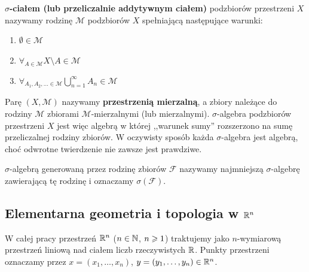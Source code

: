 \begin{defi}
    \textbf{$\sigma$-ciałem (lub przeliczalnie addytywnym ciałem)} podzbiorów przestrzeni $X$ nazywamy rodzinę $\mathcal{M}$ podzbiorów $X$ spełniającą następujące warunki:
    \begin{enumerate}
        \item $\emptyset \in \mathcal{M}$
        \item $\forall_{A \in \mathcal{M}} X \setminus A \in \mathcal{M}$
        \item $\forall_{A_1, A_2, \ldots \in \mathcal{M}} \bigcup_{n = 1}^\infty A_n \in \mathcal{M}$
    \end{enumerate}
    Parę $(X, \mathcal{M})$ nazywamy \textbf{przestrzenią mierzalną}, a zbiory należące do rodziny $\mathcal{M}$ zbiorami $\mathcal{M}$-mierzalnymi (lub mierzalnymi).
    $\sigma$-algebra podzbiorów przestrzeni $X$ jest więc algebrą w której ,,warunek sumy'' rozszerzono na sumę przeliczalnej rodziny zbiorów. W oczywisty sposób każda $\sigma$-algebra jest algebrą, choć odwrotne twierdzenie nie zawsze jest prawdziwe.
\end{defi}

\begin{defi}
    $\sigma$-algebrą generowaną przez rodzinę zbiorów $\mathcal{F}$ nazywamy najmniejszą $\sigma$-algebrę zawierającą tę rodzinę i oznaczamy $\sigma(\mathcal{F})$.
\end{defi}

\subsection{Elementarna geometria i topologia w $\mathbb{R}^{n}$}

W całej pracy przestrzeń $\mathbb{R}^{n}$ ($n \in \mathbb{N}$, $n \geqslant 1$) traktujemy jako $n$-wymiarową przestrzeń liniową nad ciałem liczb rzeczywistych $\mathbb{R}$. Punkty przestrzeni oznaczamy przez $x = (x_1, \ldots, x_n)$, $y = (y_1, \ldots, y_n) \in \mathbb{R}^{n}$.

